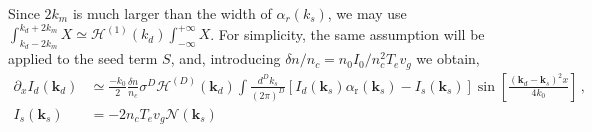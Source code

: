 \documentclass[
 reprint,
 amsmath,amssymb,
 aps,
]{revtex4-1}
\begin{document}
\begin{widetext}
Since $2k_m$ is much larger than the width of $\alpha_r(k_s)$, we may use $\int_{k_d-2k_m}^{k_d+2k_m} X \simeq \mathcal{H}^{(1)}(k_d) \int_{-\infty}^{+\infty}X$. For simplicity, the same assumption will be applied to the seed term $S$, and, introducing $\delta n/n_c=n_0I_0/{n_c^2 T_ev_g}$ we obtain, 
 \begin{align}
\partial_xI_d(\mathbf{k}_d)&\simeq  \frac{-k_0}{2} \frac{ \delta n}{n_c}   \sigma^D
 \mathcal{H}^{(D)}(\mathbf{k}_d)
 \int \frac{d^Dk_s}{(2\pi)^D}    [I_d(\mathbf{k}_s) \alpha_\mathrm{r}(\mathbf{k}_s) - I_s(\mathbf{k}_s)] \sin\left[{\frac{ (\mathbf{k}_d-\mathbf{k}_s)^2x}{4k_0}}  \right]
\, ,  \label{eq:g5}\\
I_s(\mathbf{k}_s) &=-2n_c T_ev_g   
\mathcal{N}(\mathbf{k}_s)
\end{align}
 

\end{widetext}
\end{document}
